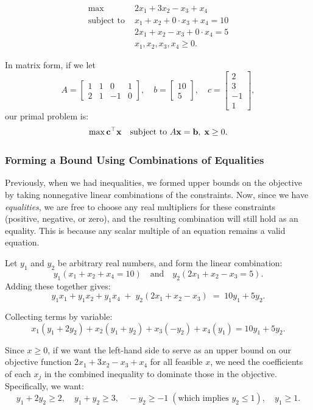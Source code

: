 \[
\begin{aligned}
\max \; & 2x_1 + 3x_2 - x_3 + x_4 \\
\text{subject to } & x_1 + x_2 + 0 \cdot x_3 + x_4 = 10 \\
& 2x_1 + x_2 - x_3 + 0 \cdot x_4 = 5 \\
& x_1, x_2, x_3, x_4 \geq 0.
\end{aligned}
\]

In matrix form, if we let 
\[
A = \begin{bmatrix}
1 & 1 & 0 & 1 \\
2 & 1 & -1 & 0
\end{bmatrix}, \quad b = \begin{bmatrix}10 \\ 5\end{bmatrix}, \quad c = \begin{bmatrix}2 \\ 3 \\ -1 \\ 1\end{bmatrix},
\]
our primal problem is:
\[
\max \mathbf{c}^\top \mathbf{x} \quad\text{subject to } A \mathbf{x} = \mathbf{b}, \; \mathbf{x} \geq 0.
\]

\subsubsection*{Forming a Bound Using Combinations of Equalities}

Previously, when we had inequalities, we formed upper bounds on the objective by taking nonnegative linear combinations of the constraints. Now, since we have \emph{equalities}, we are free to choose any real multipliers for these constraints (positive, negative, or zero), and the resulting combination will still hold as an equality. This is because any scalar multiple of an equation remains a valid equation.

Let $y_1$ and $y_2$ be arbitrary real numbers, and form the linear combination:
\[
y_1 (x_1 + x_2 + x_4 = 10) \quad \text{and} \quad y_2 (2x_1 + x_2 - x_3 = 5).
\]
Adding these together gives:
\[
y_1 x_1 + y_1 x_2 + y_1 x_4 \;+\; y_2(2x_1 + x_2 - x_3) \;=\; 10y_1 + 5y_2.
\]

Collecting terms by variable:
\[
x_1(y_1 + 2y_2) + x_2(y_1 + y_2) + x_3(-y_2) + x_4(y_1) = 10y_1 + 5y_2.
\]

Since $x \geq 0$, if we want the left-hand side to serve as an upper bound on our objective function $2x_1 + 3x_2 - x_3 + x_4$ for all feasible $x$, we need the coefficients of each $x_j$ in the combined inequality to dominate those in the objective. Specifically, we want:
\[
y_1 + 2y_2 \geq 2, \quad y_1 + y_2 \geq 3, \quad -y_2 \geq -1 \;(\text{which implies } y_2 \leq 1), \quad y_1 \geq 1.
\]

